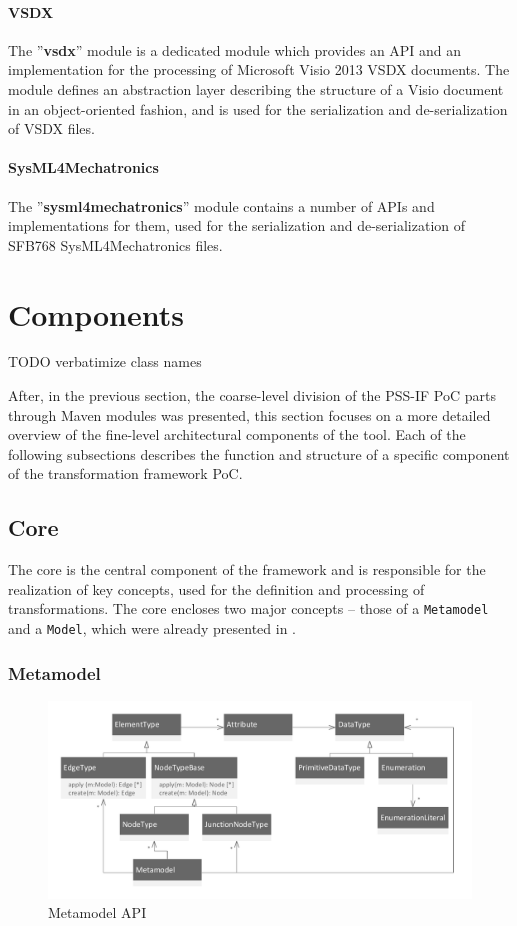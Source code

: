 \paragraph{VSDX} The ''\textbf{vsdx}'' module is a dedicated module which provides an API and an implementation for the processing of Microsoft Visio 2013 VSDX documents. The module defines an abstraction layer describing the structure of a Visio document in an object-oriented fashion, and is used for the serialization and de-serialization of VSDX files.

\paragraph{SysML4Mechatronics} The ''\textbf{sysml4mechatronics}'' module contains a number of APIs and implementations for them, used for the serialization and de-serialization of SFB768 SysML4Mechatronics files.

\section{Components}
\label{sec:impl:components}

\color{red} TODO verbatimize class names \color{black}

After, in the previous section, the coarse-level division of the PSS-IF PoC parts through Maven modules was presented, this section focuses on a more detailed overview of the fine-level architectural components of the tool. Each of the following subsections describes the function and structure of a specific component of the transformation framework PoC.

\subsection{Core}

The core is the central component of the framework and is responsible for the realization of key concepts, used for the definition and processing of transformations. The core encloses two major concepts -- those of a \texttt{Metamodel} and a \texttt{Model}, which were already presented in .

\subsubsection{Metamodel}

\begin{figure}
\centering
\includegraphics[width=\textwidth]{figures/metamodel.pdf}
\caption{Metamodel API}
\label{fig:metamodel}
\end{figure}

